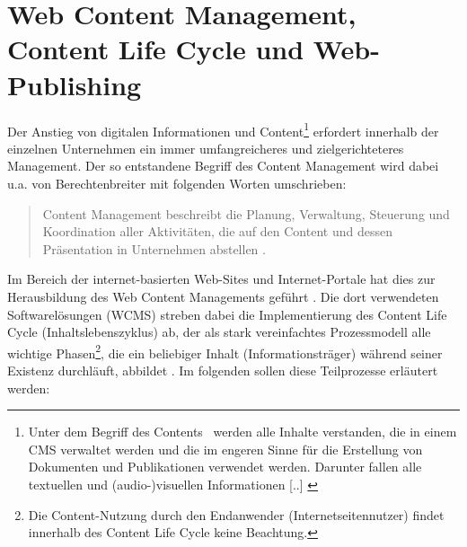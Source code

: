


\section{Web Content Management, Content Life Cycle und Web-Publishing}
\label{sec:webpublishing}
Der Anstieg von digitalen Informationen und Content\footnote{
\glqq Unter dem Begriff des \flqq Contents\frqq~ werden alle Inhalte verstanden, die in einem CMS verwaltet werden und die im engeren Sinne für die Erstellung von Dokumenten und Publikationen verwendet werden. Darunter fallen alle textuellen und (audio-)visuellen Informationen [..] \citep[S. 297]{TechnischeDok}
} erfordert innerhalb der einzelnen Unternehmen ein immer umfangreicheres und zielgerichteteres Management. Der so entstandene Begriff des Content Management wird dabei u.a. von Berechtenbreiter mit folgenden Worten umschrieben:
\begin{quote}
Content Management beschreibt die Planung, Verwaltung, Steuerung und Koordination aller Aktivitäten, die auf den Content und dessen Präsentation in Unternehmen abstellen \cite{Berchtenbreiter}.
\end{quote}

Im Bereich der internet-basierten Web-Sites und Internet-Portale hat dies zur Herausbildung des Web Content Managements geführt \citep[][S. 3]{ecm}. Die dort verwendeten Softwarelösungen (WCMS) streben dabei die Implementierung des Content Life Cycle (Inhaltslebenszyklus) ab, der als stark vereinfachtes Prozessmodell alle wichtige Phasen\footnote{Die Content-Nutzung durch den Endanwender (Internetseitennutzer) findet innerhalb des Content Life Cycle keine Beachtung.}, die ein beliebiger Inhalt (Informationsträger) während seiner Existenz durchläuft, abbildet \citep[S.303]{TechnischeDok}. Im folgenden sollen diese Teilprozesse erläutert werden:

